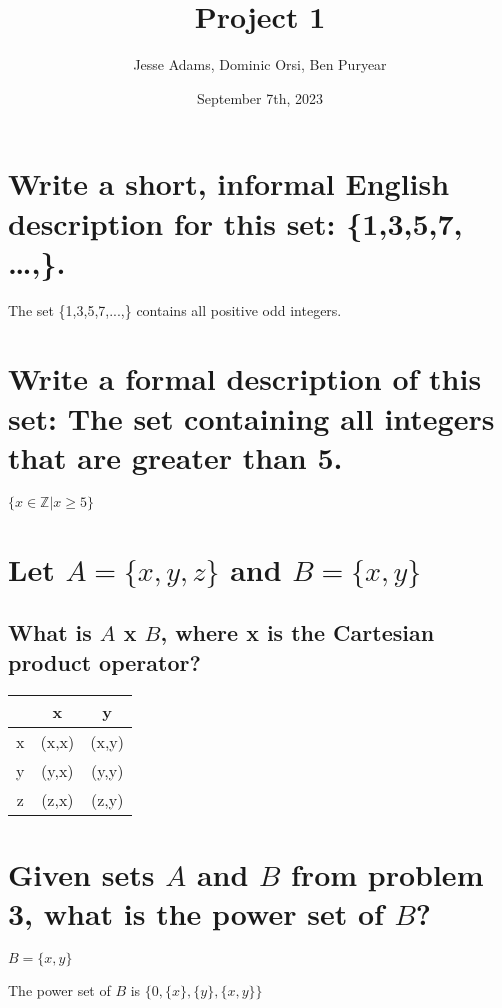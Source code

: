 \documentclass{article}
\title{Project 1}
\author{Jesse Adams, Dominic Orsi, Ben Puryear}
\date{September 7th, 2023}
\begin{document}
\maketitle

\section{Write a short, informal English description for this set: \{1,3,5,7, …,\}.}
\begin{center}
	The set \{1,3,5,7,...,\} contains all positive odd integers.
\end{center}

\section{Write a formal description of this set: The set containing all integers that are greater than 5.}
\begin{center}
	$\{x \in \mathbb{Z} | x \ge 5 \}$
\end{center}

\section{Let $A = \{x,y,z\}$ and $B = \{x,y\}$}
\subsection{What is $A$ x $B$, where x is the Cartesian product operator?}
\begin{center}
	\begin{tabular}{ |c|c|c| }
		  & x     & y     \\
		\hline
		x & (x,x) & (x,y) \\
		y & (y,x) & (y,y) \\
		z & (z,x) & (z,y) \\
	\end{tabular}
\end{center}
    
\section{Given sets $A$ and $B$ from problem 3, what is the power set of $B$?}
$B = \{x,y\}$
\begin{center}
	The power set of $B$ is $\{0, \{x\},\{y\}, \{x,y\}\}$
\end{center}
    
\end{document}
